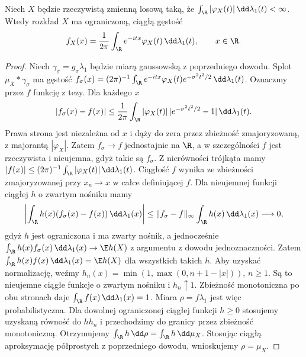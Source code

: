 \begin{stwierdzenie}
Niech $X$ będzie rzeczywistą zmienną losową taką,
że $\int_\R|\varphi_X(t)|\,\dd\lambda_1(t)<\infty$.
Wtedy rozkład $X$ ma ograniczoną, ciągłą gęstość
\[
f_X(x)=\frac1{2\pi}\int_\R e^{-itx}\varphi_X(t)
\,\dd\lambda_1(t),\qquad x\in\R.
\]
\end{stwierdzenie}
\begin{proof}
Niech $\gamma_\sigma=g_\sigma\lambda_1$ będzie miarą
gaussowską z poprzedniego dowodu. Splot $\mu_X*\gamma_\sigma$
ma gęstość
$f_\sigma(x)=(2\pi)^{-1}\int_\R e^{-itx}\varphi_X(t)
 e^{-\sigma^2t^2/2}\,\dd\lambda_1(t)$.
Oznaczmy przez $f$ funkcję z tezy. Dla każdego $x$
\[
|f_\sigma(x)-f(x)|\leq\frac1{2\pi}\int_\R
|\varphi_X(t)|\,|e^{-\sigma^2t^2/2}-1|\,\dd\lambda_1(t).
\]
Prawa strona jest niezależna od $x$ i dąży do zera
przez zbieżność zmajoryzowaną, z majorantą $|\varphi_X|$.
Zatem $f_\sigma\to f$ jednostajnie na $\R$, a w szczególności
$f$ jest rzeczywista i nieujemna, gdyż takie są $f_\sigma$.
Z nierówności trójkąta mamy $|f(x)|\leq
(2\pi)^{-1}\int_\R|\varphi_X(t)|\,\dd\lambda_1(t)$.
Ciągłość $f$ wynika ze zbieżności zmajoryzowanej przy
$x_n\to x$ w całce definiującej $f$.
Dla nieujemnej funkcji ciągłej $h$ o zwartym nośniku
mamy
\[
\left|\int_\R h(x)(f_\sigma(x)-f(x))\,\dd\lambda_1(x)\right|
\leq \|f_\sigma-f\|_\infty\int_\R h(x)\,\dd\lambda_1(x)
\longrightarrow0,
\]
gdyż $h$ jest ograniczona i ma zwarty nośnik,
a jednocześnie $\int_\R h(x)f_\sigma(x)\,\dd\lambda_1(x)
\to\E h(X)$
z argumentu z dowodu jednoznaczności.
Zatem $\int_\R h(x)f(x)\,\dd\lambda_1(x)=\E h(X)$
dla wszystkich takich $h$.
Aby uzyskać normalizację, weźmy
$h_n(x)=\min(1,\max(0,n+1-|x|))$, $n\geq1$.
Są to nieujemne ciągłe funkcje o zwartym nośniku
i $h_n\uparrow1$. Zbieżność monotoniczna po obu stronach
daje $\int_\R f(x)\,\dd\lambda_1(x)=1$.
Miara $\rho=f\lambda_1$ jest więc probabilistyczna.
Dla dowolnej ograniczonej ciągłej funkcji $h\geq0$ stosujemy
uzyskaną równość do $hh_n$ i przechodzimy do granicy
przez zbieżność monotoniczną. Otrzymujemy
$\int_\R h\,\dd\rho=\int_\R h\,\dd\mu_X$.
Stosując ciągłą aproksymację półprostych z poprzedniego
dowodu, wnioskujemy $\rho=\mu_X$.
\end{proof}

